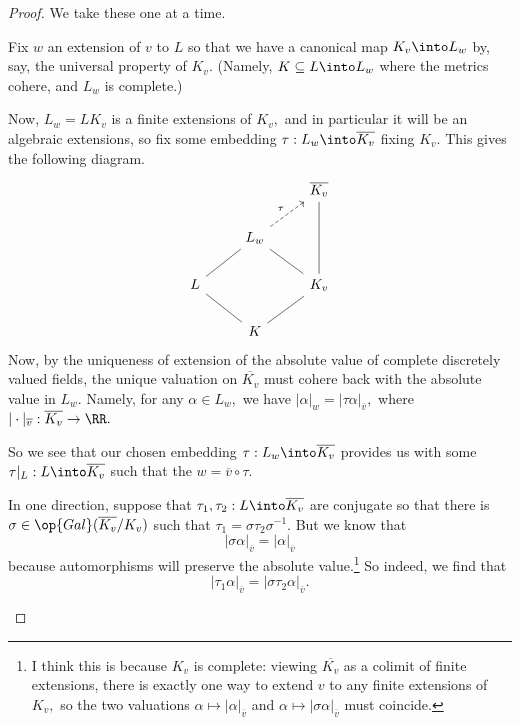 \documentclass[../notes.tex]{subfiles}
\begin{document}
\begin{proof}
	We take these one at a time.
	\begin{listalph}
		\item Fix $w$ an extension of $v$ to $L$ so that we have a canonical map $K_v\into L_w$ by, say, the universal property of $K_v.$ (Namely, $K\subseteq L\into L_w$ where the metrics cohere, and $L_w$ is complete.)

		Now, $L_w=LK_v$ is a finite extensions of $K_v,$ and in particular it will be an algebraic extensions, so fix some embedding $\tau:L_w\into\overline{K_v}$ fixing $K_v.$ This gives the following diagram.
		\[\begin{tikzcd}
			&& {\overline{K_v}} \\
			& {L_w} \\
			L && {K_v} \\
			& K
			\arrow["\tau", dashed, from=2-2, to=1-3]
			\arrow[no head, from=2-2, to=3-1]
			\arrow[no head, from=3-1, to=4-2]
			\arrow[no head, from=1-3, to=3-3]
			\arrow[no head, from=2-2, to=3-3]
			\arrow[no head, from=3-3, to=4-2]
		\end{tikzcd}\]
		Now, by the uniqueness of extension of the absolute value of complete discretely valued fields, the unique valuation on $\overline{K_v}$ must cohere back with the absolute value in $L_w.$ Namely, for any $\alpha\in L_w,$ we have $|\alpha|_w=|\tau\alpha|_{\overline v},$ where $|\cdot|_{\overline v}:\overline{K_v}\to\RR.$
		
		So we see that our chosen embedding $\tau:L_w\into\overline{K_v}$ provides us with some $\tau|_L:L\into\overline{K_v}$ such that the $w=\overline v\circ\tau.$

		\item In one direction, suppose that $\tau_1,\tau_2:L\into\overline{K_v}$ are conjugate so that there is $\sigma\in\op{Gal}(\overline{K_v}/K_v)$ such that $\tau_1=\sigma\tau_2\sigma^{-1}.$ But we know that
		\[|\sigma\alpha|_{\overline v}=|\alpha|_{\overline v}\]
		because automorphisms will preserve the absolute value.\footnote{I think this is because $K_v$ is complete: viewing $\overline{K_v}$ as a colimit of finite extensions, there is exactly one way to extend $v$ to any finite extensions of $K_v,$ so the two valuations $\alpha\mapsto|\alpha|_{\overline v}$ and $\alpha\mapsto|\sigma\alpha|_{\overline v}$ must coincide.} So indeed, we find that
		\[|\tau_1\alpha|_{\overline v}=\left|\sigma\tau_2\alpha\right|_{\overline v}.\]


\end{listalph}
\end{proof}
\end{document}

